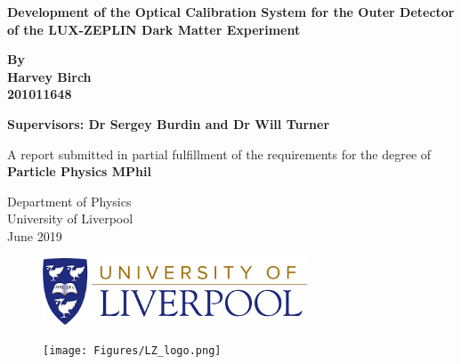 \documentclass{report}
\begin{document}
\begin{titlepage}
    \begin{center}
        \huge
        \textbf{Development of the Optical Calibration System for the Outer Detector of the LUX-ZEPLIN Dark Matter Experiment}

        
        \vspace{0.1cm}
        
    
        \LARGE
        \textbf{By\\
        \vspace{0.1cm}
        Harvey Birch\\
        \vspace{0.1cm}
         201011648}
        
        
        \vspace{1.5cm}
        
        \large
        \textbf{Supervisors: Dr Sergey Burdin and Dr Will Turner}
        
        
        \normalsize
        A report submitted in partial fulfillment of the requirements for the degree of\\
        \vspace{0.5cm}
        \large
        \textbf{Particle Physics MPhil}
        
        \vspace{0.3cm}
        
    
        \large
        Department of Physics\\
        \vspace{0.3cm}
        University of Liverpool\\
       
        
       
        June 2019
        
        \vspace{1cm}
        \begin{figure}[h]
            \centering
            \includegraphics[width=0.7\textwidth]{Figures/UoL.png}
        \end{figure}
        \begin{figure}[h]
            \centering
            \texttt{[image: Figures/LZ\_logo.png]}
        \end{figure}
        
        
    \end{center}
\end{titlepage}
\tableofcontents
\listoffigures
\listoftables
{}
\end{document}
